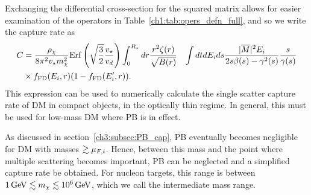 Exchanging the differential cross-section for the squared matrix allows for easier examination of the operators in Table~\ref{ch1:tab:opers_defn_full}, and so we write the capture rate as
\begin{equation}
    \begin{split}
        C &=  \frac{\rho_\chi}{8\pi^2 v_\star m_\chi^2} {\rm Erf}\left(\sqrt{\frac{3}{2}}\frac{v_\star}{v_d}\right)\int_0^{R_\star}   dr  \frac{r^2 \zeta(r) }{\sqrt{B(r)}} & \int dt dE_i ds \frac{|\overline{M}|^2 E_i}{2s\beta(s)-\gamma^2(s)} \frac{s}{\gamma(s)} \\
        &\times f_{\rm FD}(E_i,r)(1-f_{\rm FD}(E_i',r)). 
    \end{split}
    \label{ch3:eq:capturefinalM2}
\end{equation}
This expression can be used to numerically calculate the single scatter capture rate of DM in compact objects, in the optically thin regime. In general, this must be used for low-mass DM where PB is in effect.

As discussed in section~\ref{ch3:subsec:PB_cap}, PB eventually becomes negligible for DM with masses $\gtrsim \mu_{F,i}$. Hence, between this mass and the point where multiple scattering becomes important, PB can be neglected and a simplified capture rate be obtained. For nucleon targets, this range is between $1{\rm \,GeV}\lesssim m_\chi\lesssim 10^6{\rm \,GeV}$, which we call the intermediate mass range.

